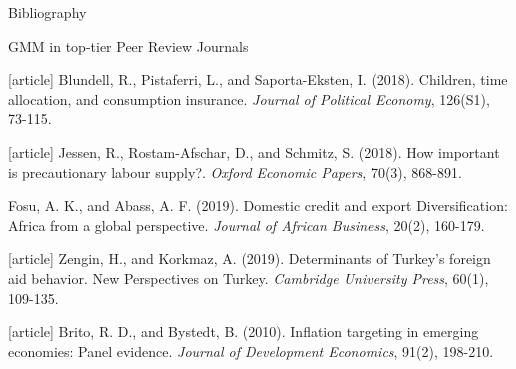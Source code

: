 \documentclass{beamer}
\begin{document}
\begin{frame}[label=Bibliography2]{Bibliography}
\vspace{-75pt} \flushright \hyperlink{Mirror}{\beamerbutton{\textcolor{red}{Mirror}}}
\vspace{50pt}
\begin{block}{\centering GMM in top-tier Peer Review Journals}
\vspace{-17pt} \flushright \hyperlink{GMM}{\beamerbutton{\textcolor{red}{Back}}}
\vspace{5pt}
\begin{thebibliography}{9}
[article]
\tiny {} Blundell, R., Pistaferri, L., and Saporta-Eksten, I. (2018). Children, time allocation, and consumption insurance. \textit{Journal of Political Economy}, 126(S1), 73-115.

[article]
\tiny {} Jessen, R., Rostam-Afschar, D., and Schmitz, S. (2018). How important is precautionary labour supply?. \textit{Oxford Economic Papers}, 70(3), 868-891.

\tiny {} Fosu, A. K., and Abass, A. F. (2019). Domestic credit and export Diversification: Africa from a global perspective. \textit{Journal of African Business}, 20(2), 160-179.

[article]
\tiny {} Zengin, H., and Korkmaz, A. (2019). Determinants of Turkey’s foreign aid behavior. New Perspectives on Turkey. \textit{Cambridge University Press}, 60(1), 109-135.

[article] 
\tiny {} Brito, R. D., and Bystedt, B. (2010). Inflation targeting in emerging economies: Panel evidence. \textit{Journal of Development Economics}, 91(2), 198-210.
\end{thebibliography}
\end{block}
\end{frame}
\end{document}
